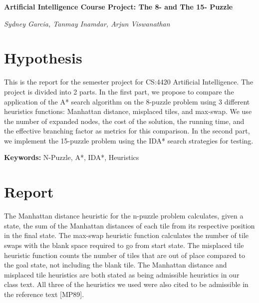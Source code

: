 \documentclass{article}
\begin{document}
	\begin{center}
		\Large \textbf{Artificial Intelligence Course Project: The 8- and The 15- Puzzle}
	\end{center}
	\begin{center}
		\textit{Sydney Garcia, Tanmay Inamdar, Arjun Viswanathan}
	\end{center}

	\section{Hypothesis}
		This is the report for the semester project for CS:4420 Artificial Intelligence. The project is divided into 2 parts. In the first part, we propose to compare the application of the A* search algorithm on the 8-puzzle problem using 3 different heuristics functions: Manhattan distance, misplaced tiles, and max-swap. We use the number of expanded nodes, the cost of the solution, the running time, and the effective branching factor as metrics for this comparison. In the second part, we implement the 15-puzzle problem using the IDA* search strategies for testing. \par 
		
		\textbf{Keywords: } N-Puzzle, A*, IDA*, Heuristics
		
	\section{Report}
		
		The Manhattan distance heuristic for the n-puzzle problem calculates, given a state, the sum of the Manhattan distances of each tile from its respective position in the final state. The max-swap heuristic function calculates the number of tile swaps with the blank space required to go from start state. The misplaced tile heuristic function counts the number of tiles that are out of place compared to the goal state, not including the blank tile. The Manhattan distance and misplaced tile heuristics are both stated as being admissible heuristics in our class text. All three of the heuristics we used were also cited to be admissible in the reference text [MP89]. \par
\end{document}
